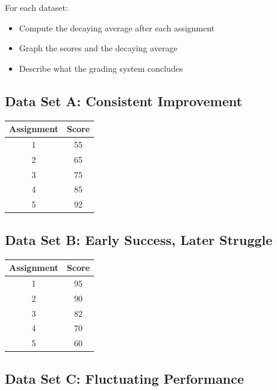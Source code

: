 \documentclass[12pt]{article}
\begin{document}
For each dataset:
\begin{itemize}
    \item Compute the decaying average after each assignment
    \item Graph the scores and the decaying average
    \item Describe what the grading system concludes
\end{itemize}

\subsection*{Data Set A: Consistent Improvement}

\begin{center}
\begin{tabular}{cc}
\toprule
Assignment & Score \\
\midrule
1 & 55 \\
2 & 65 \\
3 & 75 \\
4 & 85 \\
5 & 92 \\
\bottomrule
\end{tabular}
\end{center}

\vspace{1cm}

\subsection*{Data Set B: Early Success, Later Struggle}

\begin{center}
\begin{tabular}{cc}
\toprule
Assignment & Score \\
\midrule
1 & 95 \\
2 & 90 \\
3 & 82 \\
4 & 70 \\
5 & 60 \\
\bottomrule
\end{tabular}
\end{center}

\vspace{1cm}

\subsection*{Data Set C: Fluctuating Performance}
\end{document}
